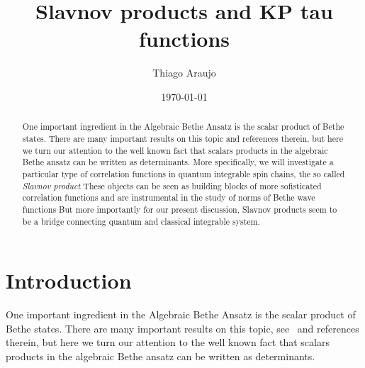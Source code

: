\documentclass[a4paper,12pt]{amsart}
\begin{document}

\title{Slavnov products and KP tau functions}

\author{Thiago Araujo}


\address{\noindent 
Instituto de Ciências Exatas, Departamento de Física\\
Universidade Federal Fluminense\\
Rua Des. Ellis Hermydio Figueira, 783, Aterrado\\
27213-145 Volta Redonda, RJ, Brazil
}


\begin{abstract}
One important ingredient in the Algebraic Bethe Ansatz is the scalar
product of Bethe states.  There are many important results on this
topic and references therein, but here we turn our attention to the
well known fact that scalars products in the algebraic Bethe ansatz
can be written as determinants.  More specifically, we will
investigate a particular type of correlation functions in quantum
integrable spin chains, the so called \emph{Slavnov product} These
objects can be seen as building blocks of more sofisticated
correlation functions and are instrumental in the study of norms of
Bethe wave functions But more importantly for our present discussion,
Slavnov products seem to be a bridge connecting quantum and classical
integrable system.
\end{abstract}

\date{\today}

\maketitle

\setcounter{tocdepth}{2}
\tableofcontents


\section{Introduction}

One important ingredient in the Algebraic Bethe Ansatz is the scalar
product of Bethe states.  There are many important results on this
topic, see~\cite{Korepin:1993kvr} and references therein, but here we
turn our attention to the well known fact that scalars products in
the algebraic Bethe ansatz can be written as determinants.
\end{document}
